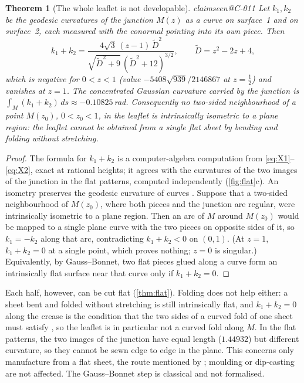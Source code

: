 \documentclass[11pt,a4paper]{article}
\makeatletter
\theoremstyle{plain}
\newtheorem{theorem}{Theorem}[section]
\theoremstyle{remark}
\newcommand{\claim}[1]{\ifcsname claimseen@#1\endcsname\else\expandafter\gdef\csname claimseen@#1\endcsname{}\label{claim:#1}\fi}
\makeatother
\begin{document}
\begin{theorem}[The whole leaflet is not developable]\label{thm:notflat}\claim{C-011}
Let $k_1,k_2$ be the geodesic curvatures of the junction $M(z)$ as a curve on surface~1 and on surface~2, each measured
with the conormal pointing into its own piece. Then
\[ k_1+k_2=\frac{4\sqrt3\,(z-1)\,\tilde D^2}{\sqrt{\tilde D^2+9}\,(\tilde D^2+12)^{3/2}},\qquad \tilde D=z^2-2z+4, \]
which is negative for $0<z<1$ (value $-5408\sqrt{939}/2146867$ at $z=\tfrac12$) and vanishes at $z=1$. The concentrated
Gaussian curvature carried by the junction is $\int_M(k_1+k_2)\,ds\approx-0.10825$\,rad. Consequently no two-sided
neighbourhood of a point $M(z_0)$, $0<z_0<1$, in the leaflet is intrinsically isometric to a plane region: the leaflet
cannot be obtained from a single flat sheet by bending and folding without stretching.
\end{theorem}
\begin{proof}
The formula for $k_1+k_2$ is a computer-algebra computation from \eqref{eq:X1}--\eqref{eq:X2}, exact at rational heights;
it agrees with the curvatures of the two images of the junction in the flat patterns, computed independently
(\cref{fig:flat}c). An isometry preserves the geodesic curvature of curves \citep[proof of their main
theorem]{FuchsTabachnikov1999}. Suppose that a two-sided neighbourhood of $M(z_0)$, where both pieces and the junction are
regular, were intrinsically isometric to a plane region. Then an arc of $M$ around $M(z_0)$ would be mapped to a single
plane curve with the two pieces on opposite sides of it, so $k_1=-k_2$ along that arc, contradicting $k_1+k_2<0$ on
$(0,1)$. (At $z=1$, $k_1+k_2=0$ at a single point, which proves nothing; $z=0$ is singular.) Equivalently, by Gauss--Bonnet,
two flat pieces glued along a curve form an intrinsically flat surface near that curve only if $k_1+k_2=0$.
\end{proof}

Each half, however, can be cut flat (\cref{thm:flat}). Folding does not help either: a sheet bent and folded without
stretching is still intrinsically flat, and $k_1+k_2=0$ along the crease is the condition that the two sides of a curved
fold of one sheet must satisfy \citep{FuchsTabachnikov1999}, so the leaflet is in particular not a curved fold along $M$.
In the flat patterns, the two images of the junction have equal length ($1.44932$) but different curvature, so they cannot
be sewn edge to edge in the plane. This concerns only manufacture from a flat sheet, the route mentioned by
\citet{Oliveira2024}; moulding or dip-casting are not affected. The Gauss--Bonnet step is classical and not formalised.
\end{document}
